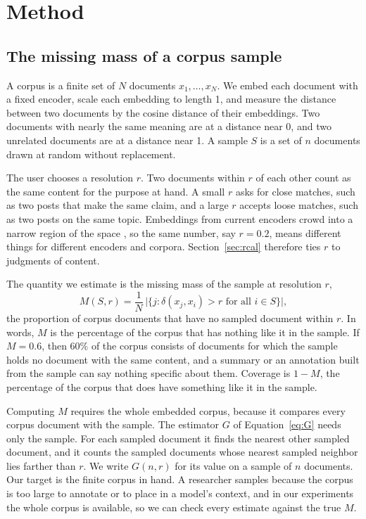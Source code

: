 \section{Method}

\subsection{The missing mass of a corpus sample}

A corpus is a finite set of $N$ documents $x_1, \dots, x_N$. We embed each document with a fixed encoder, scale each embedding to length 1, and measure the distance between two documents by the cosine distance of their embeddings. Two documents with nearly the same meaning are at a distance near 0, and two unrelated documents are at a distance near 1. A sample $S$ is a set of $n$ documents drawn at random without replacement.

The user chooses a resolution $r$. Two documents within $r$ of each other count as the same content for the purpose at hand. A small $r$ asks for close matches, such as two posts that make the same claim, and a large $r$ accepts loose matches, such as two posts on the same topic. Embeddings from current encoders crowd into a narrow region of the space \citep{ethayarajh2019}, so the same number, say $r = 0.2$, means different things for different encoders and corpora. Section~\ref{sec:rcal} therefore ties $r$ to judgments of content.

The quantity we estimate is the missing mass of the sample at resolution $r$,
\begin{equation}
M(S, r) = \frac{1}{N}\,\big|\{j : \delta(x_j, x_i) > r \text{ for all } i \in S\}\big| ,
\end{equation}
the proportion of corpus documents that have no sampled document within $r$. In words, $M$ is the percentage of the corpus that has nothing like it in the sample. If $M = 0.6$, then 60\% of the corpus consists of documents for which the sample holds no document with the same content, and a summary or an annotation built from the sample can say nothing specific about them. Coverage is $1 - M$, the percentage of the corpus that does have something like it in the sample.

Computing $M$ requires the whole embedded corpus, because it compares every corpus document with the sample. The estimator $G$ of Equation~\ref{eq:G} needs only the sample. For each sampled document it finds the nearest other sampled document, and it counts the sampled documents whose nearest sampled neighbor lies farther than $r$. We write $G(n, r)$ for its value on a sample of $n$ documents. Our target is the finite corpus in hand. A researcher samples because the corpus is too large to annotate or to place in a model's context, and in our experiments the whole corpus is available, so we can check every estimate against the true $M$.

